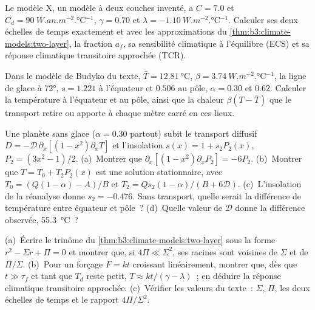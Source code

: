 \begin{exercise}[$\star\star$]\label{exo:b3:climate-models:8}
Le modèle X, un modèle à deux couches inventé, a $C = 7.0$ et $C_d =
\qty{90}{W.an.m^{-2}.\celsius^{-1}}$, $\gamma = 0.70$ et $\lambda =
\qty{-1.10}{W.m^{-2}.\celsius^{-1}}$. Calculer ses deux échelles de temps exactement
et avec les approximations du \cref{thm:b3:climate-models:two-layer}, la
fraction $a_f$, sa sensibilité climatique à l'équilibre (ECS) et sa réponse climatique transitoire approchée (TCR).
\end{exercise}

\begin{exercise}[$\star\star$]\label{exo:b3:climate-models:9}
Dans le modèle de Budyko du texte, $\bar T = \qty{12.81}{\celsius}$, $\beta =
\qty{3.74}{W.m^{-2}.\celsius^{-1}}$, la ligne de glace à \ang{72}, $s = 1.221$
à l'équateur et $0.506$ au pôle, $\alpha = 0.30$ et $0.62$.
Calculer la température à l'équateur et au pôle, ainsi que la chaleur
$\beta(T - \bar T)$ que le transport retire ou apporte à chaque
mètre carré en ces lieux.
\end{exercise}

\begin{exercise}[$\star\star\star$]\label{exo:b3:climate-models:10}
Une planète sans glace ($\alpha = 0.30$ partout) subit le transport diffusif
$D = -\mathcal D\,\partial_x[(1 - x^2)\partial_xT]$ et l'insolation
$s(x) = 1 + s_2P_2(x)$, $P_2 = (3x^2 - 1)/2$. (a)~Montrer que
$\partial_x[(1 - x^2)\partial_xP_2] = -6P_2$. (b)~Montrer que $T = T_0 +
T_2P_2(x)$ est une solution stationnaire, avec $T_0 = (Q(1 - \alpha) - A)/B$ et
$T_2 = Qs_2(1 - \alpha)/(B + 6\mathcal D)$. (c)~L'insolation de la réanalyse donne
$s_2 = \num{-0.476}$. Sans transport, quelle serait la différence de température
entre équateur et pôle~? (d)~Quelle valeur de $\mathcal D$ donne
la différence observée, \qty{55.3}{\celsius}~?
\end{exercise}

\begin{exercise}[$\star\star\star$]\label{exo:b3:climate-models:11}
(a)~Écrire le trinôme du \cref{thm:b3:climate-models:two-layer} sous la forme $r^2 -
\Sigma r + \Pi = 0$ et montrer que, si $4\Pi \ll \Sigma^2$, ses racines sont
voisines de $\Sigma$ et de $\Pi/\Sigma$. (b)~Pour un forçage $F = kt$ croissant
linéairement, montrer que, dès que $t \gg \tau_f$ et tant que $T_d$ reste petit,
$T \approx kt/(\gamma - \lambda)$~; en déduire la réponse climatique transitoire approchée. (c)~Vérifier
les valeurs du texte~: $\Sigma$, $\Pi$, les deux échelles de temps et le rapport
$4\Pi/\Sigma^2$.
\end{exercise}

